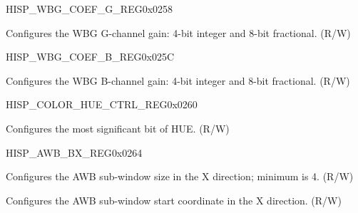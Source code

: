 \begin{register}{H}{ISP\_WBG\_COEF\_G\_REG}{0x0258}\label{regdesc:ISPWBGCOEFGREG}
%
%
\regnewline%
\begin{regdesc}\begin{reglist}
\label{fielddesc:ISPWBGG}\item [ISP\_WBG\_G] Configures the WBG G-channel gain: 4-bit integer and 8-bit fractional. (R/W)
\end{reglist}\end{regdesc}
\end{register}


\begin{register}{H}{ISP\_WBG\_COEF\_B\_REG}{0x025C}\label{regdesc:ISPWBGCOEFBREG}
%
%
\regnewline%
\begin{regdesc}\begin{reglist}
\label{fielddesc:ISPWBGB}\item [ISP\_WBG\_B] Configures the WBG B-channel gain: 4-bit integer and 8-bit fractional. (R/W)
\end{reglist}\end{regdesc}
\end{register}


\begin{register}{H}{ISP\_COLOR\_HUE\_CTRL\_REG}{0x0260}\label{regdesc:ISPCOLORHUECTRLREG}
%
%
\regnewline%
\begin{regdesc}\begin{reglist}
\label{fielddesc:ISPCOLORHUEH}\item [ISP\_COLOR\_HUE\_H] Configures the most significant bit of HUE. (R/W)
\end{reglist}\end{regdesc}
\end{register}


\begin{register}{H}{ISP\_AWB\_BX\_REG}{0x0264}\label{regdesc:ISPAWBBXREG}
%
%
%
\regnewline%
\begin{regdesc}\begin{reglist}
\label{fielddesc:ISPAWBXBSIZE}\item [ISP\_AWB\_X\_BSIZE] Configures the AWB sub-window size in the X direction; minimum is 4. (R/W)
\label{fielddesc:ISPAWBXSTART}\item [ISP\_AWB\_X\_START] Configures the AWB sub-window start coordinate in the X direction. (R/W)
\end{reglist}\end{regdesc}
\end{register}


